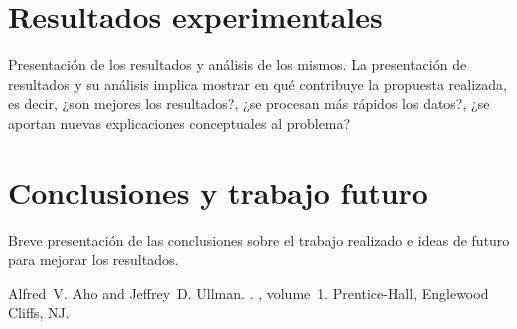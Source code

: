 \documentclass[11pt,a4paper]{article}
\begin{document}
\section{Resultados experimentales}

Presentaci\'on de los resultados y an\'alisis de los mismos. La presentaci\'on de resultados y su an\'alisis implica mostrar en qu\'e contribuye la propuesta realizada, es decir, ¿son mejores los resultados?, ¿se procesan m\'as r\'apidos los datos?, ¿se aportan nuevas explicaciones conceptuales al problema?

\section{Conclusiones y trabajo futuro}

Breve presentaci\'on de las conclusiones sobre  el trabajo realizado e ideas de futuro para mejorar los resultados.


\begin{thebibliography}{}

Alfred~V. Aho and Jeffrey~D. Ullman.
.
, volume~1.
\newblock Prentice-{Hall}, Englewood Cliffs, NJ.

\end{thebibliography}
\end{document}
